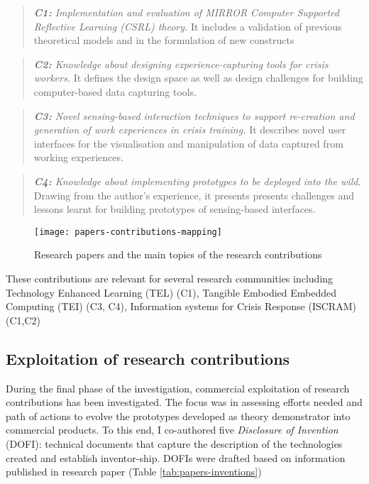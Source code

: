 \begin{quote}
\emph{\textbf{C1:} Implementation and evaluation of MIRROR Computer
Supported Reflective Learning (CSRL) theory.} It includes a validation
of previous theoretical models and in the formulation of new constructs
\end{quote}

\begin{quote}
\emph{\textbf{C2:} Knowledge about designing experience-capturing tools
for crisis workers.} It defines the design space as well as design
challenges for building computer-based data capturing tools.
\end{quote}

\begin{quote}
\emph{\textbf{C3:} Novel sensing-based interaction techniques to support
re-creation and generation of work experiences in crisis training.} It
describes novel user interfaces for the visualisation and manipulation
of data captured from working experiences.
\end{quote}

\begin{quote}
\emph{\textbf{C4:} Knowledge about implementing prototypes to be
deployed into the wild.} Drawing from the author's experience, it
presents presents challenges and lessons learnt for building prototypes
of sensing-based interfaces.
\end{quote}

\begin{figure}[tb]
    \centering
    \texttt{[image: papers-contributions-mapping]}
    \caption{Research papers and the main topics of the research contributions}
    \label{fig:mapping}
\end{figure}

These contributions are relevant for several research communities
including Technology Enhanced Learning (TEL) (C1), Tangible Embodied
Embedded Computing (TEI) (C3, C4), Information systems for Crisis
Response (ISCRAM) (C1,C2)

\subsection{Exploitation of research
contributions}\label{exploitation-of-research-contributions}

During the final phase of the investigation, commercial exploitation of
research contributions has been investigated. The focus was in assessing
efforts needed and path of actions to evolve the prototypes developed as
theory demonstrator into commercial products. To this end, I co-authored
five \emph{Disclosure of Invention} (DOFI): technical documents that
capture the description of the technologies created and establish
inventor-ship. DOFIs were drafted based on information published in
research paper (Table \ref{tab:papers-inventions})

